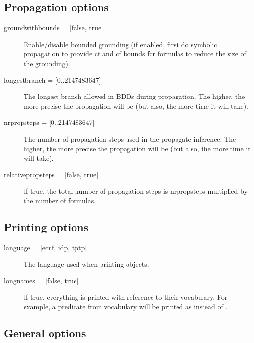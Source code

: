 \documentclass[a4]{article}
\begin{document}
\subsection{Propagation options}
\begin{description}
	\item[{groundwithbounds = [false, true]}] Enable/disable bounded grounding (if enabled, first do symbolic propagation to provide ct and cf bounds for formulas to reduce the size of the grounding).
	\item[{longestbranch = [0..2147483647]}] The longest branch allowed in BDDs during propagation. The higher, the more precise the propagation will be (but also, the more time it will take).
	\item[{nrpropsteps = [0..2147483647]}] The number of propagation steps used in the propagate-inference. The higher, the more precise the propagation will be (but also, the more time it will take).
	\item[{relativepropsteps =  [false, true]}] If true, the total number of propagation steps is nrpropsteps multiplied by the number of formulas.

\end{description}

\subsection{Printing options}
\begin{description}
	\item[{language = [ecnf, idp, %
				tptp]}] The language used when printing objects. 
	\item[{longnames = [false, true]}] If true, everything is printed with reference to their vocabulary.  For example, a predicate  from vocabulary  will be printed as  instead of .
\end{description}

\subsection{General options}
\end{document}
